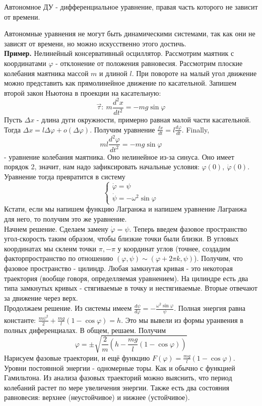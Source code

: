 \begin{defin}
Автономное ДУ - дифференциальное уравнение, правая часть которого не зависит
от времени.
\end{defin}
Автономные уравнения не могут быть динамическими системами, так как они 
не зависят от времени, но можно искусственно этого достичь.\\
\textbf{Пример.} Нелинейный консервативный
осциллятор. Рассмотрим маятник с координатами
$\varphi$ - отклонение от положения равновесия. Рассмотрим плоские
колебания маятника массой $m$ и длиной $l$. При повороте на малый угол 
движение можно представить как прямолинейное движение по касательной.
Запишем второй закон Ньютона в проекции на касательную: 
$$\vec\tau:~m\frac{d^2x}{dt^2}=-mg\sin\varphi$$ 
Пусть $\Delta x$ - длина дуги окружности, примерно равная малой части 
касательной. Тогда  $\Delta x=l\Delta\varphi+o(\Delta\varphi)$.
Получим уравнение
$\frac{fx}{dt}=l \frac{d\varphi}{dt}$. Finally,
$$ml \frac{d^2\varphi}{dt^2}=-mg\sin\varphi$$ 
- уравнение колебания маятника. Оно нелинейное из-за синуса. 
Оно имеет порядок 2, значит, нам надо
зафиксировать начальные условия: $\varphi(0),~\dot\varphi(0)$.
Уравнение тогда превратится в систему
$$\begin{cases}
    \dot\varphi=\psi\\
    \dot\psi=-\omega^2\sin\varphi
\end{cases}$$
Кстати, если мы напишем функцию Лагранжа и напишем уравнение Лагранжа для
него, то получим это же уравнение.\\
Начнем решение. Сделаем замену $\dot\varphi=\psi$. Теперь введем фазовое 
пространство угол-скорость таким образом, чтобы близкие точки были близки.
В угловых координатах мы склеим точки $\pi,-\pi$ у координат углов (точнее,
создадим факторпространство по отношению $(\varphi,\psi)\sim(\varphi+2\pi k,
\psi)$). Получим, что фазовое пространство - цилиндр. Любая замкнутая кривая 
- это некоторая траектория (вообще говоря, определляемая уравнением).
На цилиндре есть два типа замкнутых кривых - стягиваемые в точку и 
нестягиваемые. Вторые отвечают за движение через верх. \\
Продолжаем решение. Из системы имеем 
$\frac{d\psi}{d\varphi}=-\frac{\omega^2\sin\varphi}{\psi}$.
Полная энергия равна константе:
$\frac{m\psi^2}{2}+\frac{mg}{l}(1-\cos\varphi)=h$.
Это мы вывели из формы уранвения в полных диференциалах. 
В общем, решаем. Получим
$$\varphi=\pm\sqrt{\frac{2}{m}\left( h-\frac{mg}{l}(1-\cos\varphi) \right) }$$ 
Нарисуем фазовые траектории, и ещё функцию 
$F(\varphi)=\frac{mg}{l}(1-\cos\varphi)$.
Уровни постоянной энергии - одномерные торы. Как и обычно с функцией
Гамильтона. 
Из анализа фазовых траекторий можно выяснить, что период колебаний растет по
мере увеличения энергии. Также есть два состояния равновесия: верхнее 
(неустойчивое) и нижнее (устойчивое). 









